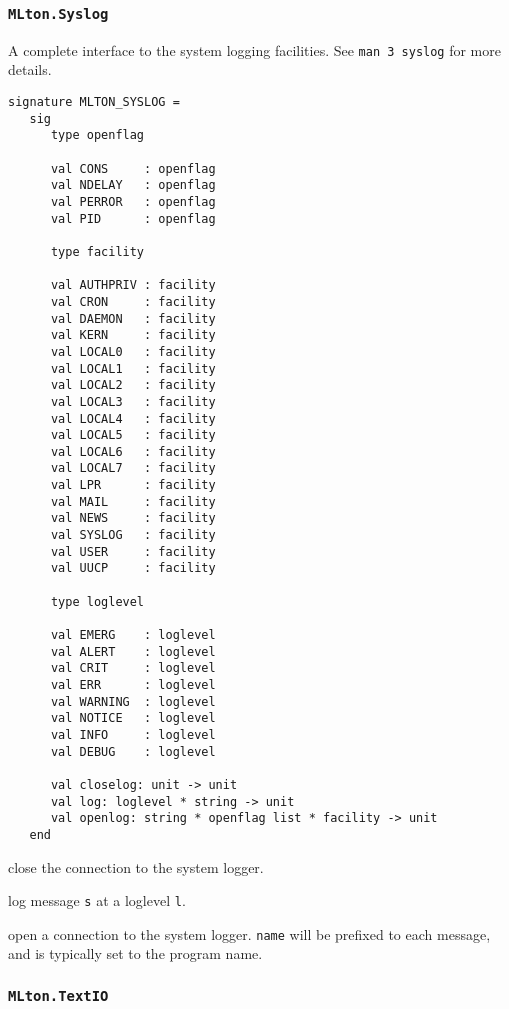 \subsubsection{\tt MLton.Syslog}

A complete interface to the system logging facilities.  See {\tt man 3 syslog}
for more details.
\begin{verbatim}
signature MLTON_SYSLOG =
   sig
      type openflag
         
      val CONS     : openflag
      val NDELAY   : openflag
      val PERROR   : openflag
      val PID      : openflag

      type facility

      val AUTHPRIV : facility
      val CRON     : facility
      val DAEMON   : facility
      val KERN     : facility
      val LOCAL0   : facility
      val LOCAL1   : facility
      val LOCAL2   : facility
      val LOCAL3   : facility
      val LOCAL4   : facility
      val LOCAL5   : facility
      val LOCAL6   : facility
      val LOCAL7   : facility
      val LPR      : facility
      val MAIL     : facility
      val NEWS     : facility
      val SYSLOG   : facility
      val USER     : facility
      val UUCP     : facility

      type loglevel

      val EMERG    : loglevel
      val ALERT    : loglevel
      val CRIT     : loglevel
      val ERR      : loglevel
      val WARNING  : loglevel
      val NOTICE   : loglevel
      val INFO     : loglevel
      val DEBUG    : loglevel

      val closelog: unit -> unit
      val log: loglevel * string -> unit
      val openlog: string * openflag list * facility -> unit
   end
\end{verbatim}

\begin{description}
close the connection to the system logger.

log message {\tt s} at a loglevel {\tt l}.

open a connection to the system logger. {\tt name} will be prefixed to each
message, and is typically set to the program name.

\end{description}
%
\subsubsection{{\tt MLton.TextIO}}

